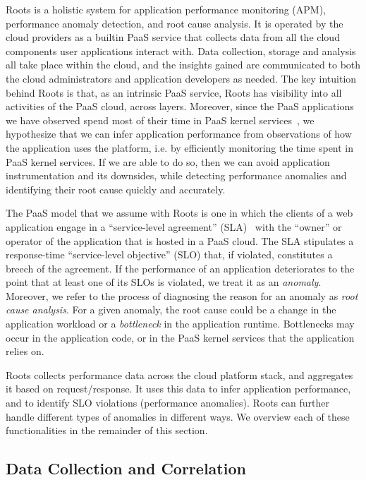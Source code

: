 Roots is a holistic system for application performance monitoring (APM), 
performance anomaly detection, and root cause analysis.
It is operated by the cloud providers as a builtin PaaS service that collects data from
all the cloud components user applications interact with. Data collection, storage
and analysis all take place within the cloud, and the insights gained are communicated
to both the cloud administrators and application developers as needed.
The key intuition behind Roots is that, as an intrinsic PaaS service, Roots
has visibility into all activities of the PaaS cloud, across layers.
Moreover, since the PaaS applications we have observed spend most of their time in 
PaaS kernel services~\cite{Jayathilaka:2015:RTS:2806777.2806842}, we hypothesize
that we can infer application performance from observations of how
 the application uses the platform, i.e. by efficiently monitoring the time spent in 
PaaS kernel services. If we are able to do so, then we can avoid application
instrumentation and its downsides, while detecting performance anomalies and 
identifying their root cause quickly and accurately.

The PaaS model that we assume with Roots is one 
in which the clients of a web application engage in a
``service-level agreement'' (SLA)~\cite{Keller:2003:WFS:635430.635442}
with the ``owner'' or operator of the application that is hosted in a PaaS cloud.  The SLA
stipulates a response-time ``service-level objective'' (SLO) that, if violated, 
constitutes a breech of the agreement.
If the performance of an application deteriorates to the
point that at least one of its SLOs is violated, we treat it 
as an \textit{anomaly}. Moreover, we refer to the process
of diagnosing the reason for 
an anomaly as \textit{root cause analysis}.
For a given anomaly, the root cause could be a change in the application workload or
a \textit{bottleneck} in the application runtime. Bottlenecks may occur in the 
application code, or in the PaaS kernel services that the application relies on.

Roots collects performance data across the cloud platform stack, and aggregates it based on 
request/response.  It uses this data to infer application performance, and to identify
SLO violations (performance anomalies).  Roots can further handle different types of anomalies
in different ways.  We overview each of these functionalities in the remainder of this section.

\subsection{Data Collection and Correlation}

